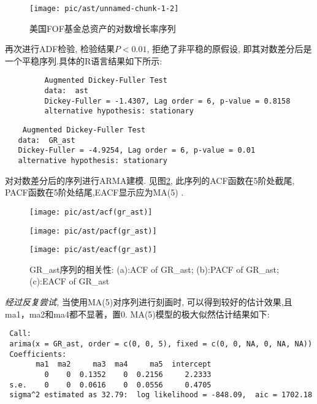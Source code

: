 \documentclass[10.5pt,onecolumn,a4paper]{article}%
\begin{document}
\begin{figure}[h!]
	\centering
	\texttt{[image: pic/ast/unnamed-chunk-1-2]}
	\caption{美国FOF基金总资产的对数增长率序列}
	\label{fig:unnamed-chunk-1-2}
\end{figure}
 再次进行ADF检验, 检验结果$P<0.01$, 拒绝了非平稳的原假设, 即其对数差分后是一个平稳序列.具体的R语言结果如下所示:
\begin{framed}
		 \begin{verbatim}
		 Augmented Dickey-Fuller Test
		 data:  ast
		 Dickey-Fuller = -1.4307, Lag order = 6, p-value = 0.8158
		 alternative hypothesis: stationary
		\end{verbatim}
	\end{framed}
\begin{framed}
	\begin{verbatim}
 	Augmented Dickey-Fuller Test 
   data:  GR_ast
   Dickey-Fuller = -4.9254, Lag order = 6, p-value = 0.01
   alternative hypothesis: stationary
	\end{verbatim}
\end{framed}
对对数差分后的序列进行ARMA建模. 见图\ref{gr_ast_ape}, 此序列的ACF函数在5阶处截尾, PACF函数在5阶处结尾,EACF显示应为MA(5) .
\begin{figure}[h!]
	\begin{minipage}[ht]{0.3\textwidth}
		\centering
		\texttt{[image: pic/ast/acf(gr\_ast)]}
		\subcaption{}\label{acf(gr_ast)}
	\end{minipage}%
	\hspace{0.04\textwidth}
	\begin{minipage}[ht]{0.3\textwidth}
		\centering
		\texttt{[image: pic/ast/pacf(gr\_ast)]}
		\subcaption{}\label{pacf(gr_ast)}
	\end{minipage}
	\hspace{0.04\textwidth}
	\begin{minipage}[ht]{0.3\textwidth}
	\centering
	\texttt{[image: pic/ast/eacf(gr\_ast)]}
	\subcaption{}\label{eacf(gr_ast)}
\end{minipage}
	\caption{GR\_ast序列的相关性: (a):ACF of GR\_ast; (b):PACF of GR\_ast; (c):EACF of GR\_ast}\label{gr_ast_ape}
\end{figure}
\emph{经过反复尝试,} 当使用MA(5)对序列进行刻画时, 可以得到较好的估计效果,且ma1，ma2和ma4都不显著，置0. MA(5)模型的极大似然估计结果如下:
\begin{framed}
\begin{verbatim}
 Call:
 arima(x = GR_ast, order = c(0, 0, 5), fixed = c(0, 0, NA, 0, NA, NA))
 Coefficients:
       ma1  ma2     ma3  ma4     ma5  intercept
         0    0  0.1352    0  0.2156     2.2333
 s.e.    0    0  0.0616    0  0.0556     0.4705
 sigma^2 estimated as 32.79:  log likelihood = -848.09,  aic = 1702.18
\end{verbatim}
\end{framed}
\end{document}
